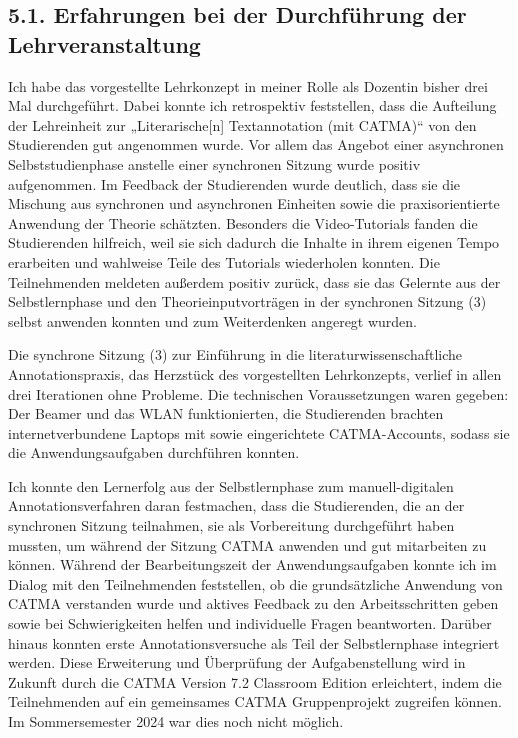\documentclass[
          a4paper,
        ]{article}
\begin{document}
\subsection{5.1. Erfahrungen bei der Durchführung der
Lehrveranstaltung}\label{erfahrungen-bei-der-durchfuxfchrung-der-lehrveranstaltung}

Ich habe das vorgestellte Lehrkonzept in meiner Rolle als Dozentin
bisher drei Mal durchgeführt. Dabei konnte ich retrospektiv feststellen,
dass die Aufteilung der Lehreinheit zur „Literarische{[}n{]}
Textannotation (mit CATMA)`` von den Studierenden gut angenommen wurde.
Vor allem das Angebot einer asynchronen Selbststudienphase anstelle
einer synchronen Sitzung wurde positiv aufgenommen. Im Feedback der
Studierenden wurde deutlich, dass sie die Mischung aus synchronen und
asynchronen Einheiten sowie die praxisorientierte Anwendung der Theorie
schätzten. Besonders die Video-Tutorials fanden die Studierenden
hilfreich, weil sie sich dadurch die Inhalte in ihrem eigenen Tempo
erarbeiten und wahlweise Teile des Tutorials wiederholen konnten. Die
Teilnehmenden meldeten außerdem positiv zurück, dass sie das Gelernte
aus der Selbstlernphase und den Theorieinputvorträgen in der synchronen
Sitzung (3) selbst anwenden konnten und zum Weiterdenken angeregt
wurden.

Die synchrone Sitzung (3) zur Einführung in die
literaturwissenschaftliche Annotationspraxis, das Herzstück des
vorgestellten Lehrkonzepts, verlief in allen drei Iterationen ohne
Probleme. Die technischen Voraussetzungen waren gegeben: Der Beamer und
das WLAN funktionierten, die Studierenden brachten internetverbundene
Laptops mit sowie eingerichtete CATMA-Accounts, sodass sie die
Anwendungsaufgaben durchführen konnten.

Ich konnte den Lernerfolg aus der Selbstlernphase zum manuell-digitalen
Annotationsverfahren daran festmachen, dass die Studierenden, die an der
synchronen Sitzung teilnahmen, sie als Vorbereitung durchgeführt haben
mussten, um während der Sitzung CATMA anwenden und gut mitarbeiten zu
können. Während der Bearbeitungszeit der Anwendungsaufgaben konnte ich
im Dialog mit den Teilnehmenden feststellen, ob die grundsätzliche
Anwendung von CATMA verstanden wurde und aktives Feedback zu den
Arbeitsschritten geben sowie bei Schwierigkeiten helfen und individuelle
Fragen beantworten. Darüber hinaus konnten erste Annotationsversuche als
Teil der Selbstlernphase integriert werden. Diese Erweiterung und
Überprüfung der Aufgabenstellung wird in Zukunft durch die CATMA Version
7.2 Classroom Edition erleichtert, indem die Teilnehmenden auf ein
gemeinsames CATMA Gruppenprojekt zugreifen können. Im Sommersemester
2024 war dies noch nicht möglich.
\end{document}
